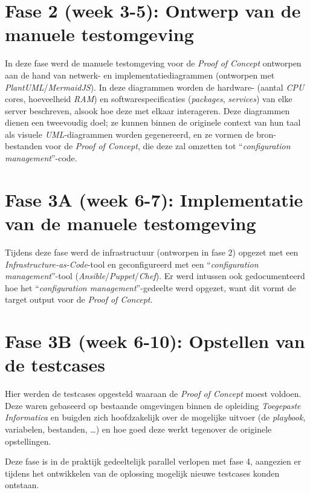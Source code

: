 \section{Fase 2 (week 3-5): Ontwerp van de manuele testomgeving}%
\label{sec:fase_ontwerp_manuele_testomgeving}

In deze fase werd de manuele testomgeving voor de \emph{Proof of Concept} ontworpen aan de hand van netwerk- en implementatiediagrammen (ontworpen met \emph{PlantUML}/\emph{MermaidJS}). In deze diagrammen worden de hardware- (aantal \emph{CPU} cores, hoeveelheid \emph{RAM}) en softwarespecificaties (\emph{packages}, \emph{services}) van elke server beschreven, alsook hoe deze met elkaar interageren.
Deze diagrammen dienen een tweevoudig doel; ze kunnen binnen de originele context van hun taal als visuele \emph{UML}-diagrammen worden gegenereerd, en ze vormen de bron-bestanden voor de \emph{Proof of Concept}, die deze zal omzetten tot ``\emph{configuration management}''-code.

\section{Fase 3A (week 6-7): Implementatie van de manuele testomgeving}%
\label{sec:fase_implementatie_manuele_testomgeving}

Tijdens deze fase werd de infrastructuur (ontworpen in fase 2) opgezet met een \emph{Infrastructure-as-Code}-tool en geconfigureerd met een ``\emph{configuration management}''-tool (\emph{Ansible}/\emph{Puppet}/\emph{Chef}). Er werd intussen ook gedocumenteerd hoe het ``\emph{configuration management}''-gedeelte werd opgezet, want dit vormt de target output voor de \emph{Proof of Concept}.

\section{Fase 3B (week 6-10): Opstellen van de testcases}%
\label{sec:fase_opstellen_testcases}

Hier werden de testcases opgesteld waaraan de \emph{Proof of Concept} moest voldoen. Deze waren gebaseerd op bestaande omgevingen binnen de opleiding \emph{Toegepaste Informatica} en buigden zich hoofdzakelijk over de mogelijke uitvoer (de \emph{playbook}, variabelen, bestanden, \ldots) en hoe goed deze werkt tegenover de originele opstellingen.

Deze fase is in de praktijk gedeeltelijk parallel verlopen met fase 4, aangezien er tijdens het ontwikkelen van de oplossing mogelijk nieuwe testcases konden ontstaan.

